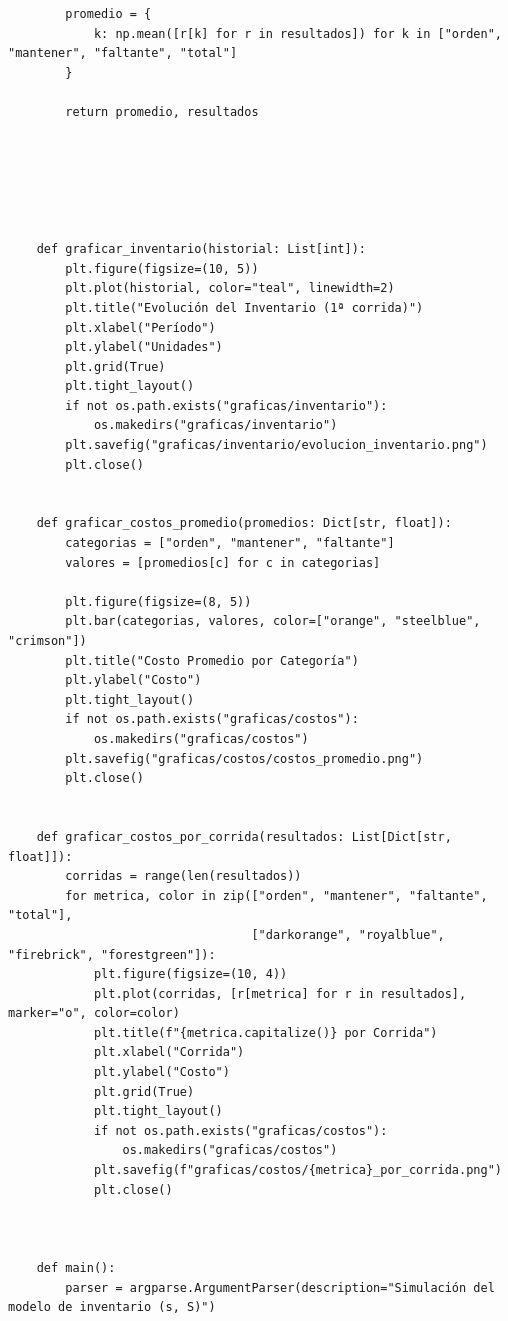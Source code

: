 \documentclass[12pt]{article}
\begin{document}
\begin{verbatim}
        promedio = {
            k: np.mean([r[k] for r in resultados]) for k in ["orden", "mantener", "faltante", "total"]
        }
    
        return promedio, resultados
    
    
    
    
    
    
    def graficar_inventario(historial: List[int]):
        plt.figure(figsize=(10, 5))
        plt.plot(historial, color="teal", linewidth=2)
        plt.title("Evolución del Inventario (1ª corrida)")
        plt.xlabel("Período")
        plt.ylabel("Unidades")
        plt.grid(True)
        plt.tight_layout()
        if not os.path.exists("graficas/inventario"):
            os.makedirs("graficas/inventario")
        plt.savefig("graficas/inventario/evolucion_inventario.png")
        plt.close()
    
    
    def graficar_costos_promedio(promedios: Dict[str, float]):
        categorias = ["orden", "mantener", "faltante"]
        valores = [promedios[c] for c in categorias]
    
        plt.figure(figsize=(8, 5))
        plt.bar(categorias, valores, color=["orange", "steelblue", "crimson"])
        plt.title("Costo Promedio por Categoría")
        plt.ylabel("Costo")
        plt.tight_layout()
        if not os.path.exists("graficas/costos"):
            os.makedirs("graficas/costos")
        plt.savefig("graficas/costos/costos_promedio.png")
        plt.close()
    
    
    def graficar_costos_por_corrida(resultados: List[Dict[str, float]]):
        corridas = range(len(resultados))
        for metrica, color in zip(["orden", "mantener", "faltante", "total"],
                                  ["darkorange", "royalblue", "firebrick", "forestgreen"]):
            plt.figure(figsize=(10, 4))
            plt.plot(corridas, [r[metrica] for r in resultados], marker="o", color=color)
            plt.title(f"{metrica.capitalize()} por Corrida")
            plt.xlabel("Corrida")
            plt.ylabel("Costo")
            plt.grid(True)
            plt.tight_layout()
            if not os.path.exists("graficas/costos"):
                os.makedirs("graficas/costos")
            plt.savefig(f"graficas/costos/{metrica}_por_corrida.png")
            plt.close()
    
    
    
    def main():
        parser = argparse.ArgumentParser(description="Simulación del modelo de inventario (s, S)")
    

\end{verbatim}
\end{document}
